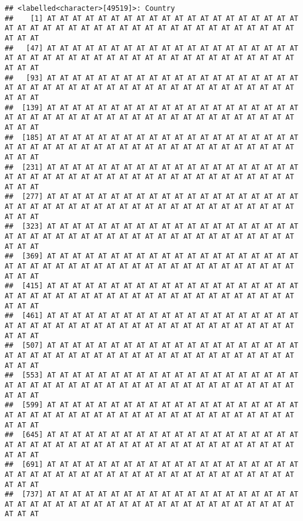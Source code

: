 \documentclass[
]{book}
\begin{document}
\begin{verbatim}
## <labelled<character>[49519]>: Country
##    [1] AT AT AT AT AT AT AT AT AT AT AT AT AT AT AT AT AT AT AT AT AT AT AT AT AT AT AT AT AT AT AT AT AT AT AT AT AT AT AT AT AT AT AT AT AT AT
##   [47] AT AT AT AT AT AT AT AT AT AT AT AT AT AT AT AT AT AT AT AT AT AT AT AT AT AT AT AT AT AT AT AT AT AT AT AT AT AT AT AT AT AT AT AT AT AT
##   [93] AT AT AT AT AT AT AT AT AT AT AT AT AT AT AT AT AT AT AT AT AT AT AT AT AT AT AT AT AT AT AT AT AT AT AT AT AT AT AT AT AT AT AT AT AT AT
##  [139] AT AT AT AT AT AT AT AT AT AT AT AT AT AT AT AT AT AT AT AT AT AT AT AT AT AT AT AT AT AT AT AT AT AT AT AT AT AT AT AT AT AT AT AT AT AT
##  [185] AT AT AT AT AT AT AT AT AT AT AT AT AT AT AT AT AT AT AT AT AT AT AT AT AT AT AT AT AT AT AT AT AT AT AT AT AT AT AT AT AT AT AT AT AT AT
##  [231] AT AT AT AT AT AT AT AT AT AT AT AT AT AT AT AT AT AT AT AT AT AT AT AT AT AT AT AT AT AT AT AT AT AT AT AT AT AT AT AT AT AT AT AT AT AT
##  [277] AT AT AT AT AT AT AT AT AT AT AT AT AT AT AT AT AT AT AT AT AT AT AT AT AT AT AT AT AT AT AT AT AT AT AT AT AT AT AT AT AT AT AT AT AT AT
##  [323] AT AT AT AT AT AT AT AT AT AT AT AT AT AT AT AT AT AT AT AT AT AT AT AT AT AT AT AT AT AT AT AT AT AT AT AT AT AT AT AT AT AT AT AT AT AT
##  [369] AT AT AT AT AT AT AT AT AT AT AT AT AT AT AT AT AT AT AT AT AT AT AT AT AT AT AT AT AT AT AT AT AT AT AT AT AT AT AT AT AT AT AT AT AT AT
##  [415] AT AT AT AT AT AT AT AT AT AT AT AT AT AT AT AT AT AT AT AT AT AT AT AT AT AT AT AT AT AT AT AT AT AT AT AT AT AT AT AT AT AT AT AT AT AT
##  [461] AT AT AT AT AT AT AT AT AT AT AT AT AT AT AT AT AT AT AT AT AT AT AT AT AT AT AT AT AT AT AT AT AT AT AT AT AT AT AT AT AT AT AT AT AT AT
##  [507] AT AT AT AT AT AT AT AT AT AT AT AT AT AT AT AT AT AT AT AT AT AT AT AT AT AT AT AT AT AT AT AT AT AT AT AT AT AT AT AT AT AT AT AT AT AT
##  [553] AT AT AT AT AT AT AT AT AT AT AT AT AT AT AT AT AT AT AT AT AT AT AT AT AT AT AT AT AT AT AT AT AT AT AT AT AT AT AT AT AT AT AT AT AT AT
##  [599] AT AT AT AT AT AT AT AT AT AT AT AT AT AT AT AT AT AT AT AT AT AT AT AT AT AT AT AT AT AT AT AT AT AT AT AT AT AT AT AT AT AT AT AT AT AT
##  [645] AT AT AT AT AT AT AT AT AT AT AT AT AT AT AT AT AT AT AT AT AT AT AT AT AT AT AT AT AT AT AT AT AT AT AT AT AT AT AT AT AT AT AT AT AT AT
##  [691] AT AT AT AT AT AT AT AT AT AT AT AT AT AT AT AT AT AT AT AT AT AT AT AT AT AT AT AT AT AT AT AT AT AT AT AT AT AT AT AT AT AT AT AT AT AT
##  [737] AT AT AT AT AT AT AT AT AT AT AT AT AT AT AT AT AT AT AT AT AT AT AT AT AT AT AT AT AT AT AT AT AT AT AT AT AT AT AT AT AT AT AT AT AT AT

\end{verbatim}
\end{document}
